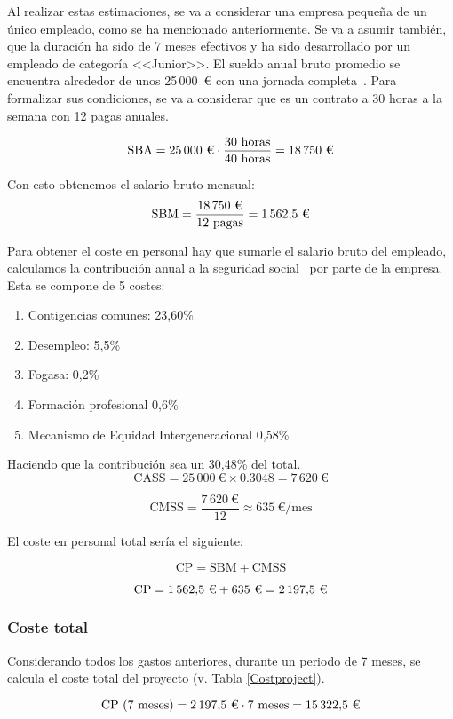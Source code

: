 Al realizar estas estimaciones, se va a considerar una empresa pequeña de un único empleado, como se ha mencionado anteriormente. Se va a asumir también, que la duración ha sido de 7 meses efectivos y ha sido desarrollado por un empleado de categoría <<Junior>>. El sueldo anual bruto promedio se encuentra alrededor de unos 25\,000~€ con una jornada completa~\cite{salario}. Para formalizar sus condiciones, se va a considerar que es un contrato a 30 horas a la semana con 12 pagas anuales.

\[
\text{SBA} = \text{25\,000~€}  \cdot \frac{\text{30 horas}}{\text{40 horas}} = \text{18\,750~€}
\]


Con esto obtenemos el salario bruto mensual: 
\[
\text{SBM} = \frac{\text{18\,750~€}}{\text{12 pagas}} = \text{1\,562,5~€}
\]

Para obtener el coste en personal hay que sumarle el salario bruto del empleado, calculamos la contribución anual a la seguridad social~\cite{seguridadsocial} por parte de la empresa.
Esta se compone de 5 costes:
\begin{enumerate}
    \item  Contigencias comunes: 23,60\%
    \item Desempleo: 5,5\%
    \item Fogasa: 0,2\%
    \item Formación profesional 0,6\%
    \item Mecanismo de Equidad Intergeneracional 0,58\%
\end{enumerate}
Haciendo que la contribución sea un 30,48\% del total.
\[
\text{CASS} = 25\,000\ \text{€} \times 0.3048 = 7\,620\ \text{€}
\]

\[
\text{CMSS} = \frac{7\,620\ \text{€}}{12} \approx 635\ \text{€/mes}
\]

El coste en personal total sería el siguiente: 

\[
\text{CP} = \text{SBM} + \text{CMSS}
\]

\[
\text{CP} = \text{1\,562,5 €} + \text{635 €} = \text{2\,197,5 €}
\]

\subsubsection{Coste total}

Considerando todos los gastos anteriores, durante un periodo de 7 meses, se calcula el coste total del proyecto (v. Tabla \ref{Costproject}).

\[
\text{CP (7 meses)} = \text{2\,197,5 €} \cdot 7 \text{ meses} = \text{15\,322,5 €}
\]

